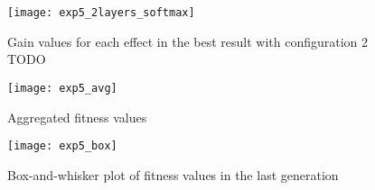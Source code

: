 \begin{figure}[h]
    \centering
    \texttt{[image: exp5\_2layers\_softmax]}
    \caption{Gain values for each effect in the best result with configuration 2 TODO}
    \label{fig:exp5_2layers_softmax}
\end{figure}

\begin{figure}[h]
    \centering
    \texttt{[image: exp5\_avg]}
    \caption{Aggregated fitness values}
    \label{fig:exp5_avg}
\end{figure}

\begin{figure}[h]
    \centering
    \texttt{[image: exp5\_box]}
    \caption{Box-and-whisker plot of fitness values in the last generation}
    \label{fig:exp5_box}
\end{figure}

